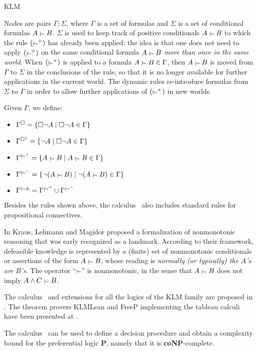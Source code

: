 \begin{entry}{KLM}
\begin{clarifications}
Nodes are pairs $\Gamma;
\Sigma$, where $\Gamma$ is a set of formulas and $\Sigma$ is a set
of conditional formulas $A \mathrel{{\scriptstyle\mid\!\sim}} B$. $\Sigma$ is used to keep
track of positive conditionals $A \mathrel{{\scriptstyle\mid\!\sim}} B$ to which the rule
$(\mathrel{{\scriptstyle\mid\!\sim}}^{+})$ has already been applied: the idea
is that one does not need to apply $(\mathrel{{\scriptstyle\mid\!\sim}}^{+})$ on the same
conditional formula $A \mathrel{{\scriptstyle\mid\!\sim}} B$ \emph{more than once in the same
world}. When $(\mathrel{{\scriptstyle\mid\!\sim}}^{+})$ is applied to a formula $A \mathrel{{\scriptstyle\mid\!\sim}} B \in \Gamma$, then $A \mathrel{{\scriptstyle\mid\!\sim}} B$ is moved from $\Gamma$ to $\Sigma$ in the conclusions of the rule, so that it is no longer available for further applications in the current world.
The dynamic rules re-introduce formulas from $\Sigma$ to $\Gamma$ in order to
allow further applications of $(\mathrel{{\scriptstyle\mid\!\sim}}^{+})$ in new  worlds.

Given $\Gamma$, we define:
\begin{itemize}
   \item $\Gamma^{\square}=\{ \square \lnot A \mid \square \lnot A \in \Gamma
    \}$
    \item $\Gamma^{\square^{\downarrow}}=\{ \lnot A \mid \square \lnot A \in \Gamma \}$
  \item     $\Gamma^{\mathrel{{\scriptstyle\mid\!\sim}}^{+}}=\{A \mathrel{{\scriptstyle\mid\!\sim}} B \mid A \mathrel{{\scriptstyle\mid\!\sim}} B \in
    \Gamma\}$
  \item     $\Gamma^{\mathrel{{\scriptstyle\mid\!\sim}}^{-}}=\{\lnot(A \mathrel{{\scriptstyle\mid\!\sim}} B) \mid \lnot(A \mathrel{{\scriptstyle\mid\!\sim}} B) \in
    \Gamma\}$
  \item     $\Gamma^{\mathrel{{\scriptstyle\mid\!\sim}}\pm}=\Gamma^{\mathrel{{\scriptstyle\mid\!\sim}}^{+}} \cup \Gamma^{\mathrel{{\scriptstyle\mid\!\sim}}^{-}}$
  \end{itemize}

Besides the rules shown above, the calculus \calcoloP \ also includes standard 
   rules for propositional connectives.
\end{clarifications}

 \begin{history}
 In \cite{KrausLehmannMagidor:90} Kraus, Lehmann and
Magidor proposed a formalization of nonmonotonic
reasoning that was early recognized as a landmark. According to their framework, defeasible knowledge is
represented by a  (finite) set of nonmonotonic conditionals or
assertions of the form
$A \mathrel{{\scriptstyle\mid\!\sim}} B$, whose reading is \emph{normally (or typically) the $A$'s
are $B$'s}. The operator ``$\mathrel{{\scriptstyle\mid\!\sim}}$'' is nonmonotonic, in the sense
that $A \mathrel{{\scriptstyle\mid\!\sim}} B$ does not imply $A \land C \mathrel{{\scriptstyle\mid\!\sim}} B$. 
 
  The calculus \calcoloP \ and extensions for all the logics of the KLM family are proposed in \cite{toclKLMpozz}. The theorem provers KLMLean and FreeP implementing the tableau calculi have been presented at \cite{tableaux2007pozz,aiia207pozz}.
 \end{history}

 \begin{technicalities}
The calculus \calcoloP \ can be used to define a decision procedure and
obtain  a complexity bound for the preferential logic {\bf P}, namely that it is
 {\bf coNP}-complete.
 \end{technicalities}













\end{entry}
